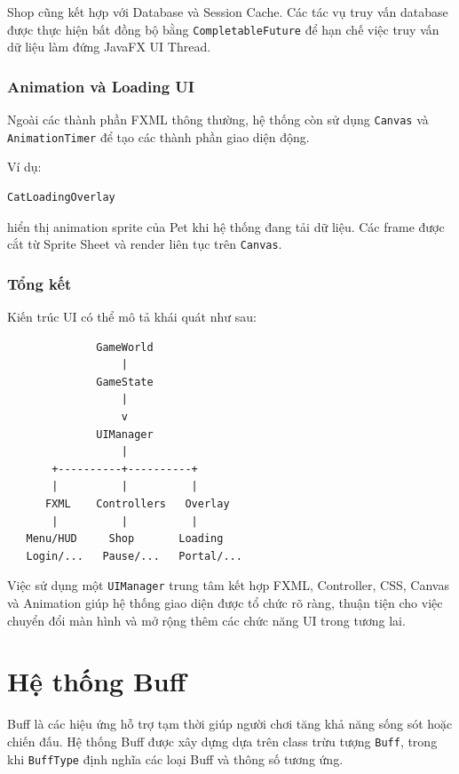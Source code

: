 \documentclass[12pt,a4paper]{report}
\begin{document}
    Shop cũng kết hợp với Database và Session Cache. Các tác vụ truy vấn
    database được thực hiện bất đồng bộ bằng \texttt{CompletableFuture}
    để hạn chế việc truy vấn dữ liệu làm đứng JavaFX UI Thread.

    \subsection{Animation và Loading UI}

    Ngoài các thành phần FXML thông thường, hệ thống còn sử dụng
    \texttt{Canvas} và \texttt{AnimationTimer} để tạo các thành phần
    giao diện động.

    Ví dụ:

    \begin{verbatim}
CatLoadingOverlay
    \end{verbatim}

    hiển thị animation sprite của Pet khi hệ thống đang tải dữ liệu.
    Các frame được cắt từ Sprite Sheet và render liên tục trên
    \texttt{Canvas}.

    \subsection{Tổng kết}

    Kiến trúc UI có thể mô tả khái quát như sau:

    \begin{verbatim}
              GameWorld
                  |
              GameState
                  |
                  v
              UIManager
                  |
       +----------+----------+
       |          |          |
      FXML    Controllers   Overlay
       |          |          |
   Menu/HUD     Shop       Loading
   Login/...   Pause/...   Portal/...
    \end{verbatim}

    Việc sử dụng một \texttt{UIManager} trung tâm kết hợp FXML,
    Controller, CSS, Canvas và Animation giúp hệ thống giao diện
    được tổ chức rõ ràng, thuận tiện cho việc chuyển đổi màn hình
    và mở rộng thêm các chức năng UI trong tương lai.


    \chapter{Hệ thống Buff}

    Buff là các hiệu ứng hỗ trợ tạm thời giúp người chơi tăng khả năng
    sống sót hoặc chiến đấu. Hệ thống Buff được xây dựng dựa trên class
    trừu tượng \texttt{Buff}, trong khi \texttt{BuffType} định nghĩa
    các loại Buff và thông số tương ứng.
\end{document}
